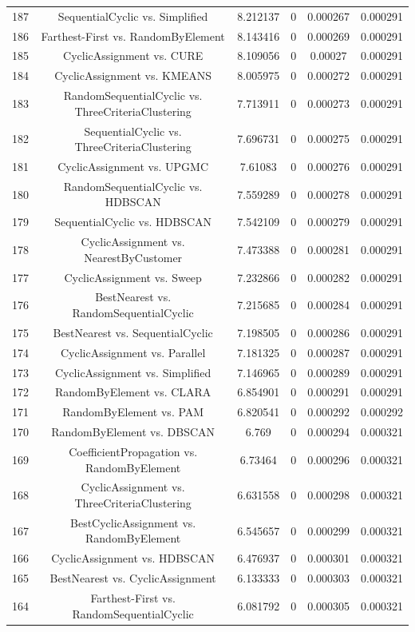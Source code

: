 \documentclass[a4paper,10pt]{article}
\begin{document}
\begin{landscape}
\begin{table}[!htp]
\begin{tabular}{cccccc}
187&SequentialCyclic vs. Simplified&8.212137&0&0.000267&0.000291\\
186&Farthest-First vs. RandomByElement&8.143416&0&0.000269&0.000291\\
185&CyclicAssignment vs. CURE&8.109056&0&0.00027&0.000291\\
184&CyclicAssignment vs. KMEANS&8.005975&0&0.000272&0.000291\\
183&RandomSequentialCyclic vs. ThreeCriteriaClustering&7.713911&0&0.000273&0.000291\\
182&SequentialCyclic vs. ThreeCriteriaClustering&7.696731&0&0.000275&0.000291\\
181&CyclicAssignment vs. UPGMC&7.61083&0&0.000276&0.000291\\
180&RandomSequentialCyclic vs. HDBSCAN&7.559289&0&0.000278&0.000291\\
179&SequentialCyclic vs. HDBSCAN&7.542109&0&0.000279&0.000291\\
178&CyclicAssignment vs. NearestByCustomer&7.473388&0&0.000281&0.000291\\
177&CyclicAssignment vs. Sweep&7.232866&0&0.000282&0.000291\\
176&BestNearest vs. RandomSequentialCyclic&7.215685&0&0.000284&0.000291\\
175&BestNearest vs. SequentialCyclic&7.198505&0&0.000286&0.000291\\
174&CyclicAssignment vs. Parallel&7.181325&0&0.000287&0.000291\\
173&CyclicAssignment vs. Simplified&7.146965&0&0.000289&0.000291\\
172&RandomByElement vs. CLARA&6.854901&0&0.000291&0.000291\\
171&RandomByElement vs. PAM&6.820541&0&0.000292&0.000292\\
170&RandomByElement vs. DBSCAN&6.769&0&0.000294&0.000321\\
169&CoefficientPropagation vs. RandomByElement&6.73464&0&0.000296&0.000321\\
168&CyclicAssignment vs. ThreeCriteriaClustering&6.631558&0&0.000298&0.000321\\
167&BestCyclicAssignment vs. RandomByElement&6.545657&0&0.000299&0.000321\\
166&CyclicAssignment vs. HDBSCAN&6.476937&0&0.000301&0.000321\\
165&BestNearest vs. CyclicAssignment&6.133333&0&0.000303&0.000321\\
164&Farthest-First vs. RandomSequentialCyclic&6.081792&0&0.000305&0.000321\\

\end{tabular}
\end{table}
\end{landscape}
\end{document}
